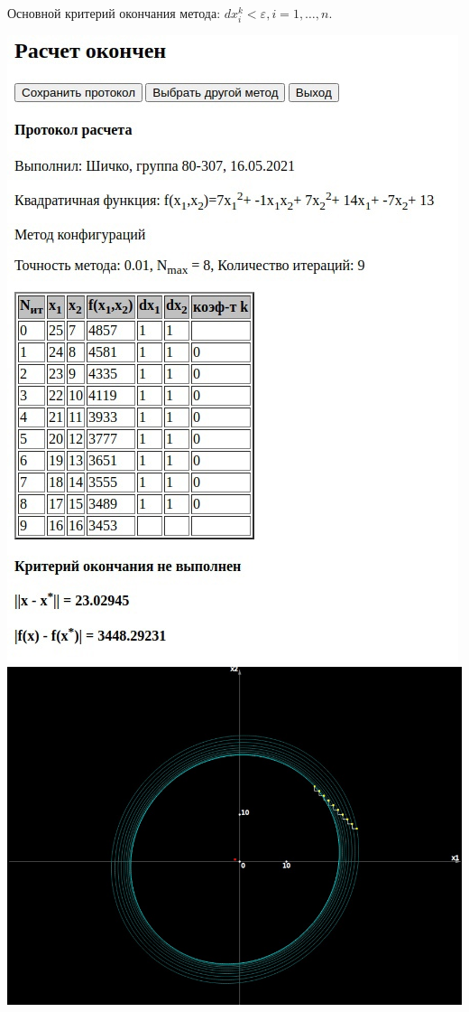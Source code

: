 Основной критерий окончания метода: $dx_{i}^{k} < \varepsilon, i = 1, \ldots, n$.

\includegraphics[width=\linewidth]{images/2_prot.jpg}\\
\includegraphics[width=\linewidth]{images/2_image.jpg}\\

